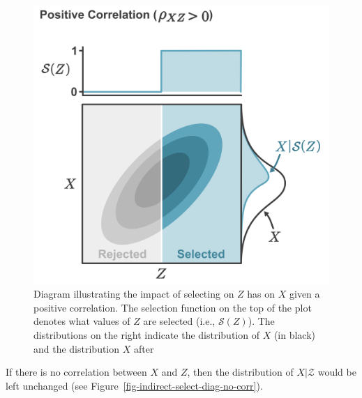 \documentclass[
  letterpaper,
  DIV=11,
  numbers=noendperiod]{scrreprt}
\begin{document}
\begin{figure}[H]

{\centering \includegraphics{figure/selection_function_indirect.png}

}

\caption{Diagram illustrating the impact of selecting on \(Z\) has on
\(X\) given a positive correlation. The selection function on the top of
the plot denotes what values of \(Z\) are selected (i.e.,
\(\mathcal{S}(Z)\)). The distributions on the right indicate the
distribution of \(X\) (in black) and the distribution \(X\) after}

\end{figure}

If there is no correlation between \(X\) and \(Z\), then the
distribution of \(X|\mathcal{Z}\) would be left unchanged (see
Figure~\ref{fig-indirect-select-diag-no-corr}).
\end{document}
